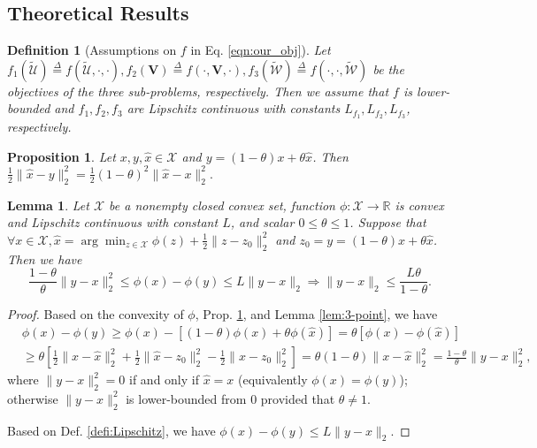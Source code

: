 \documentclass{article}
\def\ie{\emph{i.e. }}
\newtheorem{prop}{Proposition}
\newtheorem{lemma}{Lemma}
\newtheorem{defi}{Definition}
\begin{document}
\subsection{Theoretical Results}

\begin{defi}[Assumptions on $f$ in Eq. \ref{eqn:our_obj}]\label{defi:assumption}
Let $f_1(\tilde{\mathcal{U}})\stackrel{\Delta}{=}f(\tilde{\mathcal{U}}, \cdot, \cdot), f_2(\mathbf{V})\stackrel{\Delta}{=}f(\cdot, \mathbf{V}, \cdot), f_3(\tilde{\mathcal{W}})\stackrel{\Delta}{=}f(\cdot, \cdot, \tilde{\mathcal{W}})$ be the objectives of the three sub-problems, respectively. Then we assume that $f$ is lower-bounded and $f_1, f_2, f_3$ are Lipschitz continuous with constants $L_{f_1}, L_{f_2}, L_{f_3}$, respectively.
\end{defi}

\begin{prop}\label{prop:1}
Let $x,y,\hat{x}\in\mathcal{X}$ and $y=(1-\theta)x+\theta\hat{x}$. Then $\frac{1}{2}\|\hat{x}-y\|_2^2 = \frac{1}{2}\left(1-\theta\right)^2\|\hat{x}-x\|_2^2.$
\end{prop}

\begin{lemma}\label{lem:phi}
Let $\mathcal{X}$ be a nonempty closed convex set, function $\phi:\mathcal{X}\rightarrow \mathbb{R}$ is convex and Lipschitz continuous with constant $L$, and scalar $0\leq\theta\leq 1$. Suppose that $\forall x\in\mathcal{X}, \hat{x}=\arg\min_{z\in\mathcal{X}}\phi(z)+\frac{1}{2}\|z-z_0\|_2^2$ and $z_0=y=(1-\theta)x+\theta\hat{x}$. Then we have
$$\frac{1-\theta}{\theta}\|y-x\|_2^2 \leq \phi(x)-\phi(y) \leq L\|y-x\|_2 \Rightarrow \|y-x\|_2\leq \frac{L\theta}{1-\theta}.$$
\end{lemma}
\begin{proof}
Based on the convexity of $\phi$, Prop. \ref{prop:1}, and Lemma \ref{lem:3-point}, we have
\begin{align}
& \phi(x)-\phi(y) \geq\phi(x)-\left[\left(1-\theta\right)\phi(x)+\theta\phi(\hat{x})\right]=\theta\left[\phi(x) - \phi(\hat{x})\right] \nonumber \\
&\geq \theta\left[\frac{1}{2}\|x-\hat{x}\|_2^2 + \frac{1}{2}\|\hat{x} - z_0\|_2^2 - \frac{1}{2}\|x-z_0\|_2^2\right] = \theta\left(1-\theta\right)\|x-\hat{x}\|_2^2 = \frac{1-\theta}{\theta}\|y-x\|_2^2, \nonumber 
\end{align}
where $\|y-x\|_2^2=0$ if and only if $\hat{x}=x$ (equivalently $\phi(x)=\phi(y)$); otherwise $\|y-x\|_2^2$ is lower-bounded from 0 provided that $\theta\neq 1$.

Based on Def. \ref{defi:Lipschitz}, we have $\phi(x)-\phi(y) \leq L\|y-x\|_2$.
\end{proof}
\end{document}

